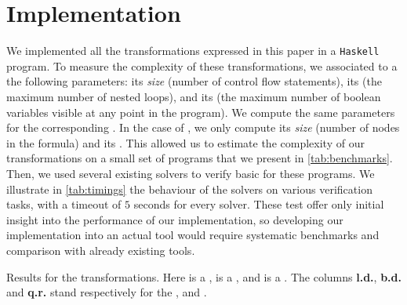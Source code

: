 \section{Implementation}
\label{sec:benchmarks}

\AP We implemented all the transformations expressed in this paper in a
\texttt{Haskell} program. To measure the complexity of these transformations,
we associated to a  the following parameters: its
\emph{size} (number of control flow statements), its  (the
maximum number of nested loops), and its  (the maximum
number of boolean variables visible at any point in the program). We compute
the same parameters for the corresponding . In the case
of , we only compute its \emph{size} (number of
nodes in the formula) and its . This allowed us to
estimate the complexity of our transformations on a small set of programs that we present in
\cref{tab:benchmarks}. Then, we used several existing solvers to verify basic
 for these programs. We
illustrate in \cref{tab:timings} the behaviour of the solvers on various
verification tasks, with a timeout of $5$ seconds for every solver.
These test offer only initial insight into the performance of our implementation,
so developing our implementation into an actual tool would require systematic 
benchmarks and comparison with already existing tools.


\begin{table}[t]
    \caption{Results for the transformations. 
        Here  is a ,
         is a ,
        and  is a .
        The columns \textbf{l.d.}, \textbf{b.d.} and \textbf{q.r.}
        stand respectively for the , 
         and .
    }
    \label{tab:benchmarks}
    \centering
    
\end{table}

